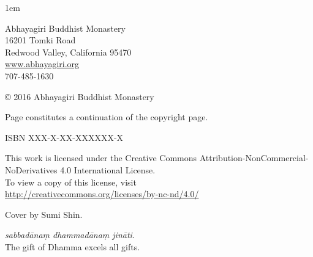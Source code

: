 \thispagestyle{empty}
{\raggedright\small
\parindent 0pt
\parskip 1em

Abhayagiri Buddhist Monastery\\
16201 Tomki Road\\
Redwood Valley, California 95470\\
\href{http://www.abhayagiri.org}{www.abhayagiri.org}\\
707-485-1630

© 2016 Abhayagiri Buddhist Monastery

Page \pageref{credits} constitutes a continuation of the copyright page.

ISBN XXX-X-XX-XXXXXX-X


This work is licensed under the Creative Commons
Attribution-NonCommercial-NoDerivatives 4.0 International License.\\
To view a copy of this license, visit\\
\href{http://creativecommons.org/licenses/by-nc-nd/4.0}
{http://creativecommons.org/licenses/by-nc-nd/4.0/}

Cover by Sumi Shin.

\emph{sabbadānaṃ dhammadānaṃ jināti.}\\
The gift of Dhamma excels all gifts.

}
\clearpage
